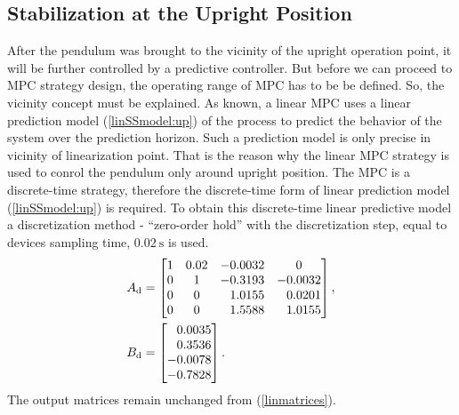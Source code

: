 \subsection{Stabilization at the Upright Position}
After the pendulum was brought to the vicinity of the upright operation point, it will be further controlled by a predictive controller. But before we can proceed to MPC strategy design, the operating range of MPC has to be be defined. So, the vicinity concept must be explained. As known, a linear MPC uses a linear prediction model (\ref{linSSmodel:up}) of the process to predict the behavior of the system over the prediction horizon. Such a prediction model is only precise in vicinity of linearization point. That is the reason why the linear MPC strategy is used to conrol the pendulum only around upright position. 
The MPC is a discrete-time strategy, therefore the discrete-time form of linear prediction model (\ref{linSSmodel:up}) is required. To obtain this discrete-time linear predictive model a discretization method - ``zero-order hold''  with the discretization step, equal to devices sampling time, $\SI{0.02}{\second}$ is used.
\begin{subequations}\label{dismatrices}
	\begin{align}
	A _{\text{d}} &=\begin{bmatrix}
	1&0.02&-0.0032& 0\\
	0&1&-0.3193&-0.0032\\
	0&0&\ \; \,1.0155&\ \; \,0.0201\\
	0&0&\ \; \,1.5588&\ \; \,1.0155
	\end{bmatrix},\\
	B _{\text{d}} &=\begin{bmatrix}
	\ \; \,0.0035\\
	\ \; \,0.3536\\
	-0.0078\\
	-0.7828
	\end{bmatrix}.
	\end{align}
\end{subequations}
The output matrices remain unchanged from (\ref{linmatrices}).\\ 

